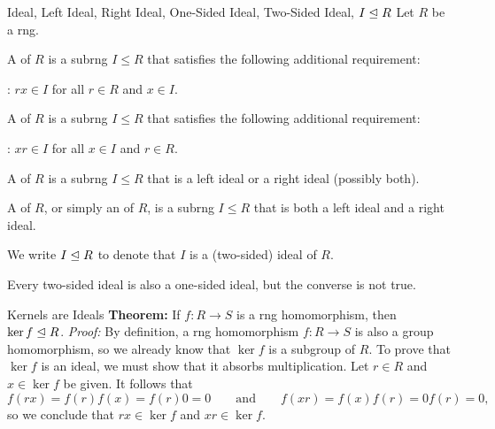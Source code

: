 \documentclass[12pt]{report}
\begin{document}
\begin{dfnbox}{Ideal, Left Ideal, Right Ideal, One-Sided Ideal, Two-Sided Ideal, $I \trianglelefteq R$}
	Let $R$ be a rng.
	\begin{dfnitems}
		\item A  of $R$ is a subrng $I \le R$ that satisfies the following additional requirement:
		\begin{dfnitems}
			\item {}: $rx \in I$ for all $r \in R$ and $x \in I$.
		\end{dfnitems}
		\item A  of $R$ is a subrng $I \le R$ that satisfies the following additional requirement:
		\begin{dfnitems}
			\item {}: $xr \in I$ for all $x \in I$ and $r \in R$.
		\end{dfnitems}
		\item A  of $R$ is a subrng $I \le R$ that is a left ideal or a right ideal (possibly both).
		\item A  of $R$, or simply an  of $R$, is a subrng $I \le R$ that is both a left ideal and a right ideal.
	\end{dfnitems}
	We write $I \trianglelefteq R$ to denote that $I$ is a (two-sided) ideal of $R$.
\end{dfnbox}

Every two-sided ideal is also a one-sided ideal, but the converse is not true.

\begin{thmbox}{Kernels are Ideals}
	\textbf{Theorem:} If $f: R \to S$ is a rng homomorphism, then $\ker f \trianglelefteq R$.
\tcblower
	\textit{Proof:} By definition, a rng homomorphism $f: R \to S$ is also a group homomorphism, so we already know that $\ker f$ is a subgroup of $R$. To prove that $\ker f$ is an ideal, we must show that it absorbs multiplication. Let $r \in R$ and $x \in \ker f$ be given. It follows that
	\[ f(rx) = f(r)f(x) = f(r)0 = 0
	\qquad \text{and} \qquad
	f(xr) = f(x)f(r) = 0f(r) = 0, \]
	so we conclude that $rx \in \ker f$ and $xr \in \ker f$.
\end{thmbox}
\end{document}
